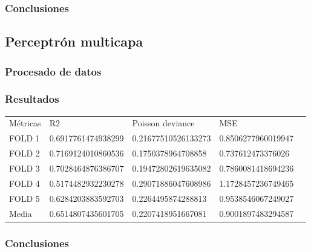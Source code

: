 \subsubsection{Conclusiones}

\subsection{Perceptrón multicapa}
\subsubsection{Procesado de datos}
\subsubsection{Resultados}
\begin{table}[htbp]
    \begin{tabular}{|l|l|l|l|l}
    \cline{1-4}
    Métricas & R2                  & Poisson deviance    & MSE                \\ \cline{1-4}
    FOLD 1   & 0.6917761474938299  & 0.21677510526133273 & 0.8506277960019947 \\ \cline{1-4}
    FOLD 2   & 0.7169124010860536  & 0.1750378964708858  & 0.737612473376026  \\ \cline{1-4}
    FOLD 3   & 0.7028464876386707  & 0.19472802619635082 & 0.7860081418694236 \\ \cline{1-4}
    FOLD 4   & 0.5174482932230278  & 0.29071886047608986 & 1.1728457236749465 \\ \cline{1-4}
    FOLD 5   & 0.6284203883592703  & 0.2264495874288813  & 0.9538546067249027 \\ \cline{1-4}
    Media    & 0.6514807435601705  & 0.2207418951667081  & 0.9001897483294587 \\ \cline{1-4}
\end{tabular}
\end{table}
\subsubsection{Conclusiones}
